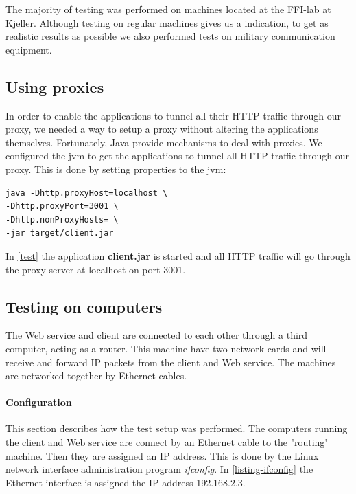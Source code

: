 The majority of testing was performed on machines located at the FFI-lab at
Kjeller. Although testing on regular machines gives us a indication, to get as
realistic results as possible we also performed tests on military communication
equipment.

\subsection{Using proxies}

In order to enable the applications to tunnel all their HTTP traffic through our
proxy, we needed a way to setup a proxy without altering the applications
themselves. Fortunately, Java provide mechanisms to deal with
proxies\cite{oracle-proxy}. We configured the \gls{jvm} to get the applications
to tunnel all HTTP traffic through our proxy. This is done by setting properties
to the \gls{jvm}:


\begin{lstlisting}[frame=single, caption="Setting a proxy on the \gls{jvm}", label=test]
java -Dhttp.proxyHost=localhost \
-Dhttp.proxyPort=3001 \
-Dhttp.nonProxyHosts= \
-jar target/client.jar
\end{lstlisting}

In \cref{test} the application \textbf{client.jar} is started and all HTTP
traffic will go through the proxy server at localhost on port 3001.

\subsection{Testing on computers}

 The Web service and client are connected to each other through a third
 computer, acting as a router. This machine have two network cards and will
 receive and forward IP packets from the client and Web service. The machines
 are networked together by Ethernet cables.

\paragraph{Configuration}

This section describes how the test setup was performed. The computers running
the client and Web service are connect by an Ethernet cable to the "routing"
machine. Then they are assigned an IP address. This is done by the Linux network
interface administration program \textit{ifconfig}. In \cref{listing-ifconfig}
the Ethernet interface is assigned the IP address 192.168.2.3.

